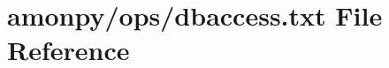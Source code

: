 \hypertarget{dbaccess_8txt}{\section{amonpy/ops/dbaccess.txt File Reference}
\label{dbaccess_8txt}
}
